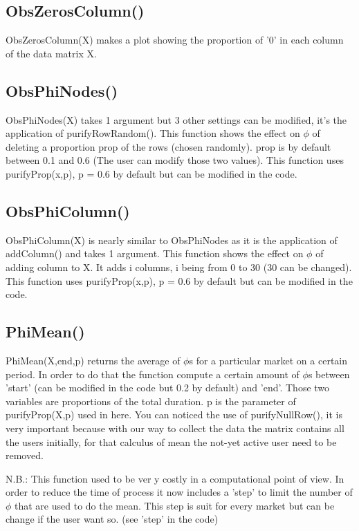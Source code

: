 \documentclass{report}
\begin{document}
\subsection{ObsZerosColumn()}

ObsZerosColumn(X) makes a plot showing the proportion of '0' in each column of the data matrix X.

\subsection{ObsPhiNodes()}

ObsPhiNodes(X) takes 1 argument but 3 other settings can be modified, it's the application of purifyRowRandom(). This function shows the effect on $\phi $ of deleting a proportion prop of the rows (chosen randomly). prop is by default between 0.1 and 0.6 (The user can modify those two values). This function uses purifyProp(x,p), p = 0.6 by default but can be modified in the code. 

\subsection{ObsPhiColumn()}

ObsPhiColumn(X) is nearly similar to ObsPhiNodes as it is the application of addColumn() and takes 1 argument. This function shows the effect on $\phi $ of adding column to X. It adds i columns, i being from 0 to 30 (30 can be changed). This function uses purifyProp(x,p), p = 0.6 by default but can be modified in the code. 

\subsection{PhiMean()}

PhiMean(X,end,p) returns the average of $\phi $s for a particular market on a certain period. In order to do that the function compute a certain amount of $\phi $s between 'start' (can be modified in the code but 0.2 by default) and 'end'. Those two variables are proportions of the total duration. p is the parameter of purifyProp(X,p) used in here. You can noticed the use of purifyNullRow(), it is very important because with our way to collect the data the matrix contains all the users initially, for that calculus of mean the not-yet active user need to be removed.

N.B.: This function used to be ver y costly in a computational point of view. In order to reduce the time of process it now includes a 'step' to limit the number of $\phi $ that are used to do the mean. This step is suit for every market but can be change if the user want so. (see 'step' in the code)
\end{document}
